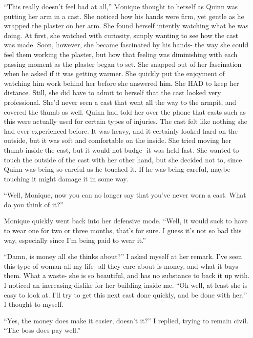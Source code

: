 \begin{thought}
``This really doesn't feel bad at all,'' Monique thought to herself as Quinn was putting her
arm in a cast. She noticed how his hands were firm, yet gentle as he wrapped the plaster on her
arm. She found herself intently watching what he was doing. At first, she watched with
curiosity, simply wanting to see how the cast was made. Soon, however, she became fascinated by
his hands- the way she could feel them working the plaster, but how that feeling was diminishing
with each passing moment as the plaster began to set. She snapped out of her fascination when he
asked if it was getting warmer. She quickly put the enjoyment of watching him work behind her
before she answered him. She HAD to keep her distance. Still, she did have to admit to herself
that the cast looked very professional. She'd never seen a cast that went all the way to the
armpit, and covered the thumb as well. Quinn had told her over the phone that casts such as this
were actually used for certain types of injuries. The cast felt like nothing she had ever
experienced before. It was heavy, and it certainly looked hard on the outside, but it was soft
and comfortable on the inside. She tried moving her thumb inside the cast, but it would not
budge- it was held fast. She wanted to touch the outside of the cast with her other hand, but
she decided not to, since Quinn was being so careful as he touched it. If he was being careful,
maybe touching it might damage it in some way.
\end{thought}

``Well, Monique, now you can no longer say that you've never worn a cast. What do you think
of it?''

Monique quickly went back into her defensive mode. ``Well, it would suck to have to wear one
for two or three months, that's for sure. I guess it's not so bad this way, especially since I'm
being paid to wear it.''

``Damn, is money all she thinks about?'' I asked myself at her remark. I've seen this type
of woman all my life- all they care about is money, and what it buys them. What a waste- she is
so beautiful, and has no substance to back it up with. I noticed an increasing dislike for her
building inside me. ``Oh well, at least she is easy to look at. I'll try to get this next cast
done quickly, and be done with her,'' I thought to myself.

``Yes, the money does make it easier, doesn't it?'' I replied, trying to remain civil. ``The
boss does pay well.''

